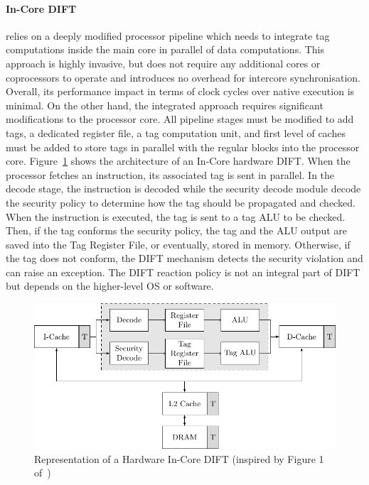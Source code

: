 \paragraph{In-Core DIFT} relies on a deeply modified processor pipeline which needs to integrate tag computations inside the main core in parallel of data computations. This approach is highly invasive, but does not require any additional cores or coprocessors to operate and introduces no overhead for intercore synchronisation. Overall, its performance impact in terms of clock cycles over native execution is minimal. On the other hand, the integrated approach requires significant modifications to the processor core. All pipeline stages must be modified to add tags, a dedicated register file, a tag computation unit, and first level of caches must be added to store tags in parallel with the regular blocks into the processor core. Figure~\ref{fig:incore_dift} shows the architecture of an In-Core hardware DIFT. When the processor fetches an instruction, its associated tag is sent in parallel. In the decode stage, the instruction is decoded while the security decode module decode the security policy to determine how the tag should be propagated and checked. When the instruction is executed, the tag is sent to a tag ALU to be checked. Then, if the tag conforms the security policy, the tag and the ALU output are saved into the Tag Register File, or eventually, stored in memory. Otherwise, if the tag does not conform, the DIFT mechanism detects the security violation and can raise an exception. The DIFT reaction policy is not an integral part of DIFT but depends on the higher-level OS or software.

\begin{figure}[ht]
    \centering
    \includegraphics{c2_soa/img/incore.pdf}
    \caption{Representation of a Hardware In-Core DIFT (inspired by Figure 1 of~\cite{KDK-09-dsn})}
    \label{fig:incore_dift}
\end{figure}

